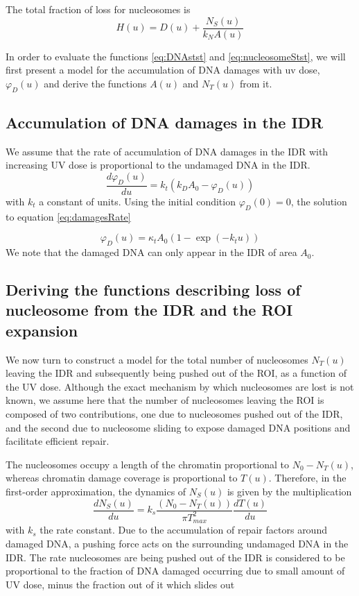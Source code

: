\documentclass[12pt]{article}
\begin{document}
	The total fraction of loss for nucleosomes is
	\begin{equation}\label{eq:nucleosomeStst}
	H(u) = D(u) + \frac{N_S(u)}{k_NA(u)}	
	\end{equation}
	
	In order to evaluate the functions \ref{eq:DNAstst} and \ref{eq:nucleosomeStst}, we will first present a model for the accumulation of DNA damages with uv dose, $\varphi_D(u)$ and derive the functions $A(u)$ and $N_T(u)$ from it. 
	
	\subsection{Accumulation of DNA damages in the IDR}\label{subsection:AccumulationOfDNADamagesInTheIDR}
	We assume that the rate of accumulation of DNA damages in the
	IDR with increasing UV dose is proportional to the undamaged DNA in the IDR.	
	\begin{equation*}\label{eq:damagesRate}
	\frac{d\varphi_D(u)}{du} = k_t(k_DA_0 - \varphi_D(u))
	\end{equation*}	
	with $k_t$ a constant of units. Using the initial condition $\varphi_D(0) = 0$, the solution to equation \ref{eq:damagesRate}
	
	\begin{equation*}\label{eq:damagesIDR}
	\varphi_D(u) = \kappa_tA_0(1-\exp(−k_tu))
	\end{equation*}
	We note that the damaged DNA can only appear in the IDR of area $A_0$.
	
	\subsection{Deriving the functions describing loss of nucleosome from the IDR and the ROI expansion}
	We now turn to construct a model for the total number of nucleosomes $N_T(u)$
	leaving the IDR and subsequently being pushed out of the ROI, as a function
	of the UV dose. Although the exact mechanism by which nucleosomes are
	lost is not known, we assume here that the number of nucleosomes leaving
	the ROI is composed of two contributions, one due to nucleosomes pushed
	out of the IDR, and the second due to nucleosome sliding to expose damaged
	DNA positions and facilitate efficient repair.
	
	The nucleosomes occupy a length of the chromatin proportional to $N_0-
	N_T(u)$, whereas chromatin damage coverage is proportional to $T(u)$. Therefore, in the first-order approximation, the dynamics of $N_S(u)$ is given by the multiplication
	\begin{equation*}
	\frac{dN_S(u)}{du} = k_s\frac{(N_0-N_T(u))}{\pi T_{max}^2}\frac{dT(u)}{du}	
	\end{equation*}
	with $k_s$ the rate constant. Due to the accumulation of repair factors around
	damaged DNA, a pushing force acts on the surrounding undamaged DNA in
	the IDR. The rate nucleosomes are being pushed out of the IDR is considered
	to be proportional to the fraction of DNA damaged occurring due to small amount of
	UV dose, minus the fraction out of it which slides out
	
\end{document}
